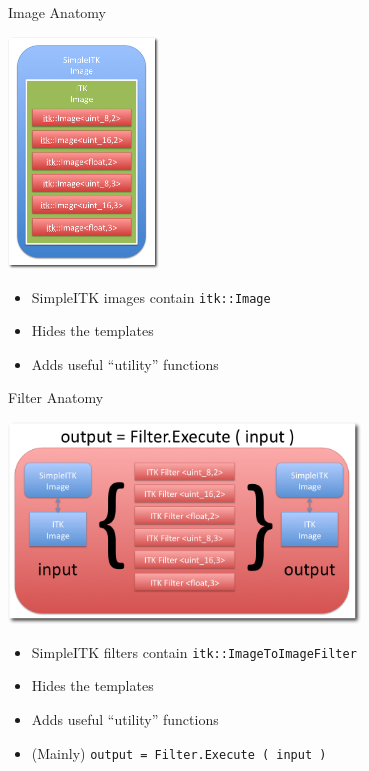 \begin{frame}{Image Anatomy}
\begin{center}
  \includegraphics[width=0.3\textwidth]{Images/SimpleITKImageAnatomy_shadow}
\end{center}
\begin{itemize}
  \item SimpleITK images contain \texttt{itk::Image}
  \item Hides the templates
  \item Adds useful ``utility'' functions
\end{itemize}
\end{frame}

\begin{frame}{Filter Anatomy}
\begin{center}
  \includegraphics[width=0.7\textwidth]{Images/FilterInternals_shadow}
\end{center}
\begin{itemize}
  \item SimpleITK filters contain \texttt{itk::ImageToImageFilter}
  \item Hides the templates
  \item Adds useful ``utility'' functions
  \item (Mainly) \texttt{output = Filter.Execute ( input )}
\end{itemize}
\end{frame}



